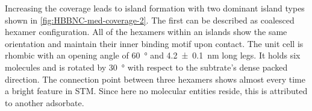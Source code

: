


%

Increasing the coverage leads to island formation with two dominant island types shown in \autoref{fig:HBBNC-med-coverage-2}. The first can be described as coalesced hexamer configuration. All of the hexamers within an islands show the same orientation and maintain their inner binding motif upon contact. The unit cell is rhombic with an opening angle of \SI{60}{\degree} and \SI{4.2 \pm 0.1}{\nano \meter} long legs. It holds six molecules and is rotated by \SI{30}{\degree} with respect to the subtrate's dense packed direction. The connection point between three hexamers shows almost every time a bright feature in STM. Since here no molecular entities reside, this is attributed to another adsorbate. 

